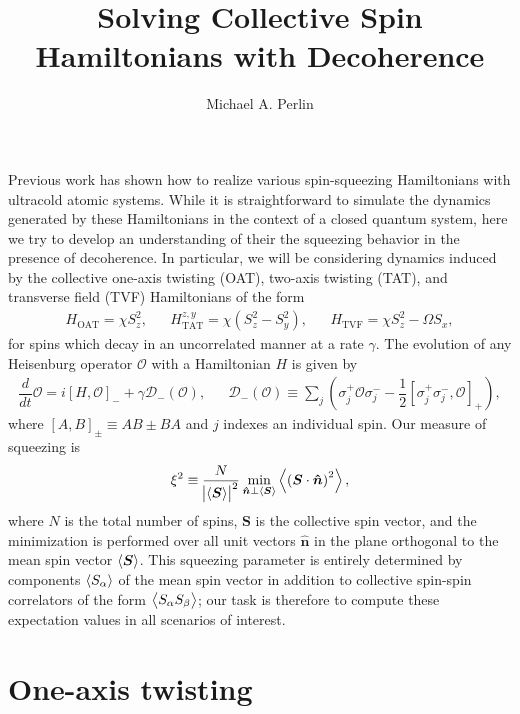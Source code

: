 \documentclass[aps,notitlepage,nofootinbib,11pt]{revtex4-1}
\renewcommand{\t}{\text} %
\newcommand{\f}[2]{\dfrac{#1}{#2}} %
\newcommand{\p}[1]{\left(#1\right)} %
\renewcommand{\sp}[1]{\left[#1\right]} %
\renewcommand{\v}{\bm} %
\newcommand{\uv}[1]{\v{\hat{#1}}} %
\renewcommand{\c}{\cdot} %
\newcommand{\bk}{\Braket} %
\newcommand{\D}{\mathcal{D}}
\renewcommand{\O}{\mathcal{O}}
\newcommand{\1}{\mathds{1}}
\begin{document}
\title{Solving Collective Spin Hamiltonians with Decoherence}

\author{Michael A. Perlin}

\maketitle

Previous work has shown how to realize various spin-squeezing
Hamiltonians with ultracold atomic systems.  While it is
straightforward to simulate the dynamics generated by these
Hamiltonians in the context of a closed quantum system, here we try to
develop an understanding of their the squeezing behavior in the
presence of decoherence.  In particular, we will be considering
dynamics induced by the collective one-axis twisting (OAT), two-axis
twisting (TAT), and transverse field (TVF) Hamiltonians of the form
\begin{align}
  H_{\t{OAT}} = \chi S_z^2,
  &&
  H_{\t{TAT}}^{z,y} = \chi \p{S_z^2 - S_y^2},
  &&
  H_{\t{TVF}} = \chi S_z^2 - \Omega S_x,
\end{align}
for spins which decay in an uncorrelated manner at a rate $\gamma$.
The evolution of any Heisenburg operator $\O$ with a Hamiltonian $H$
is given by
\begin{align}
  \f{d}{dt} \O
  = i\sp{H,\O}_- + \gamma\D_-\p{\O},
  &&
  \D_-\p{\O} \equiv \sum_j\p{\sigma_j^+\O\sigma_j^-
    - \f12\sp{\sigma_j^+\sigma_j^-,\O}_+},
  \label{eq:EOM}
\end{align}
where $\sp{A,B}_\pm\equiv AB\pm BA$ and $j$ indexes an individual
spin.  Our measure of squeezing is
\begin{align}
  \xi^2 \equiv \f{N}{\abs{\bk{\v S}}^2}
  \min_{\uv n\perp\bk{\v S}} \bk{\p{\v S\c\uv n}^2},
  \label{eq:squeezing}
\end{align}
where $N$ is the total number of spins, $\v S$ is the collective spin
vector, and the minimization is performed over all unit vectors
$\uv n$ in the plane orthogonal to the mean spin vector $\bk{\v S}$.
This squeezing parameter is entirely determined by components
$\bk{S_\alpha}$ of the mean spin vector in addition to collective
spin-spin correlators of the form $\bk{S_\alpha S_\beta}$; our task is
therefore to compute these expectation values in all scenarios of
interest.


\section{One-axis twisting}
\end{document}
